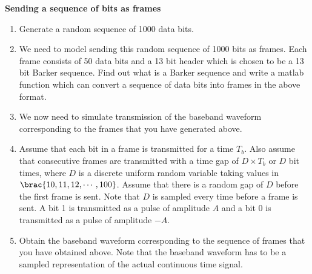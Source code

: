 \textbf{Sending a sequence of bits as frames}
\begin{enumerate}
\item Generate a random sequence of 1000 data bits. 
\item We need to model sending this random sequence of 1000 bits as frames. Each frame consists of 50 data bits and a 13 bit header which is chosen to be a 13 bit Barker sequence. Find out what is a Barker sequence and write a matlab function which can convert a sequence of data bits into frames in the above format.
\item We now need to simulate transmission of the baseband waveform corresponding to the frames that you have generated above.
\item Assume that each bit in a frame is transmitted for a time $T_{b}$. Also assume that consecutive frames are transmitted with a time gap of $D \times T_{b}$ or $D$ bit times, where $D$ is a discrete uniform random variable taking values in $\brac{10,11,12,\cdots,100}$. Assume that there is a random gap of $D$ before the first frame is sent. Note that $D$ is sampled every time before a frame is sent. A bit 1 is transmitted as a pulse of amplitude $A$ and a bit 0 is transmitted as a pulse of amplitude $-A$.
\item Obtain the baseband waveform corresponding to the sequence of frames that you have obtained above. Note that the baseband waveform has to be a sampled representation of the actual continuous time signal.
\end{enumerate}

